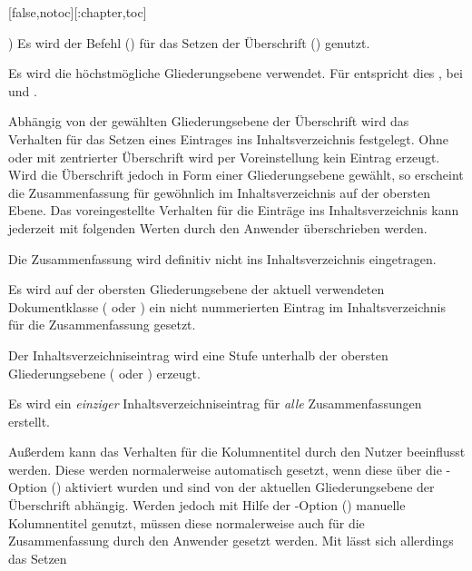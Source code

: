 \begin{Declaration*}{}
\begin{Declaration*}{}
\begin{Declaration*}{}
\begin{Declaration}[%
  v2.02!\Option{abstract=multiple}:ersetzt \Option{abstract=double}'none';%
  v2.02!\Option{abstract=tocleveldown};%
  v2.02!\Option{abstract=markboth};%
  v2.04!\Option{abstract=tocmultiple}%
]{}[false,notoc][:chapter,toc]
\begin{values}{}
  )
  Es wird der Befehl () für das Setzen der 
  Überschrift () genutzt. 
\item[heading]
  Es wird die höchstmögliche Gliederungsebene verwendet. Für 
   entspricht dies , bei 
   und  .
\end{values}
%
Abhängig von der gewählten Gliederungsebene der Überschrift wird das Verhalten 
für das Setzen eines Eintrages ins Inhaltsverzeichnis festgelegt. Ohne oder mit 
zentrierter Überschrift wird per Voreinstellung kein Eintrag erzeugt. Wird die 
Überschrift jedoch in Form einer Gliederungsebene gewählt, so erscheint die 
Zusammenfassung für gewöhnlich im Inhaltsverzeichnis auf der obersten Ebene. 
Das voreingestellte Verhalten für die Einträge ins Inhaltsverzeichnis kann 
jederzeit mit folgenden Werten durch den Anwender überschrieben werden.
%
\begin{values}{}
\item[notoc/nottotoc]
  Die Zusammenfassung wird definitiv nicht ins Inhaltsverzeichnis eingetragen.
\item[toc/totoc]
  Es wird auf der obersten Gliederungsebene der aktuell verwendeten 
  Dokumentklasse ( oder ) ein nicht 
  nummerierten Eintrag im Inhaltsverzeichnis für die Zusammenfassung gesetzt.
\item[tocleveldown/leveldown/totocleveldown]
  Der Inhaltsverzeichniseintrag wird eine Stufe unterhalb der obersten 
  Gliederungsebene ( oder ) erzeugt.
\item[tocmultiple/totocmultiple/tocaggregate/totocaggregate]
  Es wird ein \emph{einziger} Inhaltsverzeichniseintrag für \emph{alle} 
  Zusammenfassungen erstellt.
\end{values}
%
Außerdem kann das Verhalten für die Kolumnentitel durch den Nutzer beeinflusst 
werden. Diese werden normalerweise automatisch gesetzt, wenn diese über die 
\KOMAScript-Option () aktiviert 
wurden und sind von der aktuellen Gliederungsebene der Überschrift abhängig. 
Werden jedoch mit Hilfe der \KOMAScript-Option 
() manuelle Kolumnentitel genutzt, 
müssen diese normalerweise auch für die Zusammenfassung durch den Anwender 
gesetzt werden. Mit  lässt sich allerdings das Setzen 

\end{Declaration}
\end{Declaration*}
\end{Declaration*}
\end{Declaration*}
